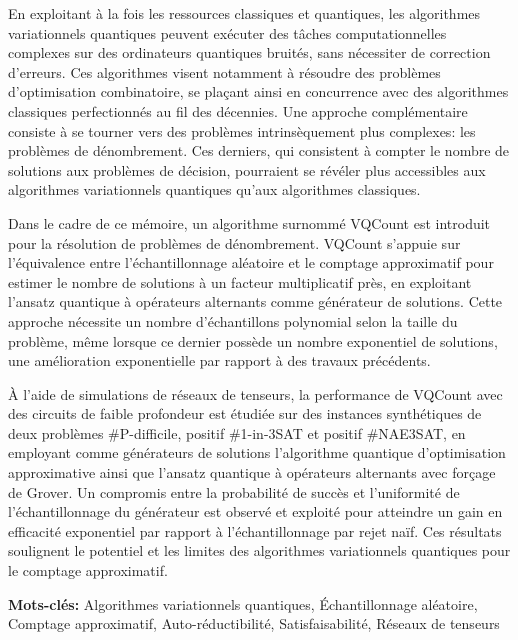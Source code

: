 En exploitant à la fois les ressources classiques et quantiques, les algorithmes variationnels quantiques peuvent exécuter des tâches computationnelles complexes sur des ordinateurs quantiques bruités, sans nécessiter de correction d'erreurs. Ces algorithmes visent notamment à résoudre des problèmes d'optimisation combinatoire, se plaçant ainsi en concurrence avec des algorithmes classiques perfectionnés au fil des décennies. Une approche complémentaire consiste à se tourner vers des problèmes intrinsèquement plus complexes: les problèmes de dénombrement. Ces derniers, qui consistent à compter le nombre de solutions aux problèmes de décision, pourraient se révéler plus accessibles aux algorithmes variationnels quantiques qu'aux algorithmes classiques.

Dans le cadre de ce mémoire, un algorithme surnommé VQCount est introduit pour la résolution de problèmes de dénombrement. VQCount s'appuie sur l'équivalence entre l'échantillonnage aléatoire et le comptage approximatif pour estimer le nombre de solutions à un facteur multiplicatif près, en exploitant l'ansatz quantique à opérateurs alternants comme générateur de solutions. Cette approche nécessite un nombre d'échantillons polynomial selon la taille du problème, même lorsque ce dernier possède un nombre exponentiel de solutions, une amélioration exponentielle par rapport à des travaux précédents.

À l'aide de simulations de réseaux de tenseurs, la performance de VQCount avec des circuits de faible profondeur est étudiée sur des instances synthétiques de deux problèmes \textsf{\#P}-difficile, positif \#1-in-3SAT et positif \#NAE3SAT, en employant comme générateurs de solutions l'algorithme quantique d'optimisation approximative ainsi que l'ansatz quantique à opérateurs alternants avec forçage de Grover. Un compromis entre la probabilité de succès et l'uniformité de l'échantillonnage du générateur est observé et exploité pour atteindre un gain en efficacité exponentiel par rapport à l'échantillonnage par rejet naïf. Ces résultats soulignent le potentiel et les limites des algorithmes variationnels quantiques pour le comptage approximatif.

\noindent
\textbf{Mots-clés:} Algorithmes variationnels quantiques, Échantillonnage aléatoire, Comptage approximatif, Auto-réductibilité, Satisfaisabilité, Réseaux de tenseurs
